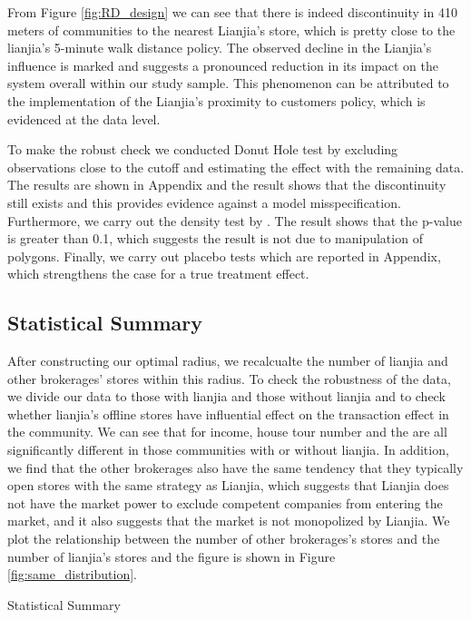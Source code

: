 \documentclass[12pt]{article}
\begin{document}
From Figure \ref{fig:RD_design} we can see that there is indeed discontinuity in 410 meters of communities to the nearest Lianjia's store, which is pretty close to the lianjia's 5-minute walk distance policy. The observed decline in the Lianjia's influence is marked and suggests a pronounced reduction in its impact on the system overall within our study sample. This phenomenon can be attributed to the implementation of the Lianjia's proximity to customers policy, which is evidenced at the data level. 

To make the robust check we conducted Donut Hole test by excluding observations close to the cutoff and estimating the effect with the remaining data. The results are shown in Appendix and the result shows that the discontinuity still exists and this provides evidence against a model misspecification. Furthermore, we carry out the density test by \citep{MCCRARY2008698}. The result shows that the p-value is greater than 0.1, which suggests the result is not due to manipulation of polygons. Finally, we carry out placebo tests which are reported in Appendix, which strengthens the case for a true treatment effect.

\subsection{Statistical Summary} \label{subsec:Statistical_Summary}

After constructing our optimal radius, we recalcualte the number of lianjia and other brokerages' stores within this radius. To check the robustness of the data, we divide our data to those with lianjia and those without lianjia and to check whether lianjia's offline stores have influential effect on the transaction effect in the community. We can see that for income, house tour number and the are all significantly different in those communities with or without lianjia. In addition, we find that the other brokerages also have the same tendency that they typically open stores with the same strategy as Lianjia, which suggests that Lianjia does not have the market power to exclude competent companies from entering the market, and it also suggests that the market is not monopolized by Lianjia. We plot the relationship between the number of other brokerages's stores and the number of lianjia's stores and the figure is shown in Figure \ref{fig:same_distribution}.

\begin{table}[htb!]
    \centering
    \begin{tiny}
    \caption{Statistical Summary}
    
    \label{tab:statistical}
    \end{tiny}
\end{table}
\end{document}
